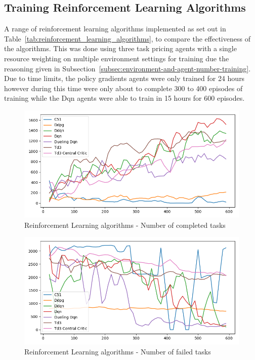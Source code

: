 \subsection{Training Reinforcement Learning Algorithms}
\label{subsec:training-reinforcement-learning-algorithms}

A range of reinforcement learning algorithms implemented as set out in Table~\ref{tab:reinforcement_learning_algorithms},
to compare the effectiveness of the algorithms. This was done using three task pricing agents with
a single resource weighting on multiple environment settings for training due the reasoning given in
Subsection~\ref{subsec:environment-and-agent-number-training}. Due to time limits, the policy gradients agents were
only trained for 24 hours however during this time were only about to complete 300 to 400 episodes of training while
the Dqn agents were able to train in 15 hours for 600 episodes.

\begin{figure}[H]
    \centering
    \includegraphics[width=\linewidth]{figures/5_evaluation_figs/algo_training_fig/num_completed_tasks.png}
    \caption{Reinforcement Learning algorithms - Number of completed tasks}
    \label{fig:algo-num-completed_tasks}
\end{figure}

\begin{figure}[H]
    \centering
    \includegraphics[width=\linewidth]{figures/5_evaluation_figs/algo_training_fig/num_failed_tasks.png}
    \caption{Reinforcement Learning algorithms - Number of failed tasks}
    \label{fig:algo-num-failed-tasks}
\end{figure}


